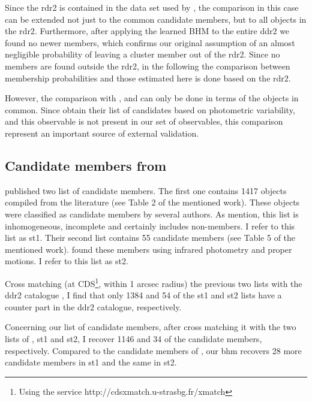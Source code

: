 Since the \gls{rdr2} is contained in the data set used by \citet{Bouy2015}, the comparison in this case can be extended not just to the common candidate members, but to all objects in the \gls{rdr2}. Furthermore, after applying the learned BHM to the entire \gls{ddr2} we found no newer members, which confirms our original assumption of an almost negligible probability of leaving a cluster member out of the \gls{rdr2}. Since no members are found outside the \gls{rdr2}, in the following the comparison between \citet{Bouy2015} membership probabilities and those estimated here is done based on the \gls{rdr2}.
 
 However, the comparison with \citet{Stauffer2007}, and \citet{Rebull2016} can only be done in terms of the objects in common. Since \citet{Rebull2016} obtain their list of candidates based on photometric variability, and this observable is not present in our set of observables, this comparison represent an important source of external validation. 


\subsection{Candidate members from \citet{Stauffer2007}}

\citet{Stauffer2007} published two list of candidate members. The first one contains 1417 objects compiled from the literature (see Table 2 of the mentioned work). These objects were classified as candidate members by several authors. As \citet{Stauffer2007} mention, this list is inhomogeneous, incomplete and certainly includes non-members. I refer to this list as \gls{st1}. Their second list contains 55 candidate members (see Table 5 of the mentioned work). \citet{Stauffer2007} found these members using infrared photometry and proper motions. I refer to this list as \gls{st2}.

Cross matching (at CDS\footnote{ Using the service http://cdsxmatch.u-strasbg.fr/xmatch}, within 1 arcsec radius) the previous two lists with the \gls{ddr2} catalogue \citep{Bouy2015}, I find that only 1384 and 54 of the \gls{st1} and \gls{st2} lists have a counter part in the \gls{ddr2} catalogue, respectively. 

Concerning our list of candidate members, after cross matching it with the two lists of \citet{Stauffer2007}, \gls{st1} and \gls{st2}, I recover 1146 and 34 of the candidate members, respectively. Compared to the candidate members of \citet{Bouy2015}, our \gls{bhm} recovers 28 more candidate members in \gls{st1} and the same in \gls{st2}.

